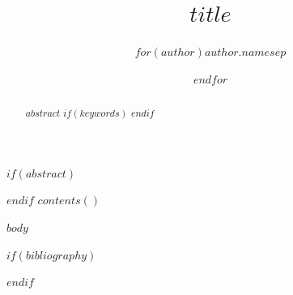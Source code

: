 \documentclass[$for(classoption)$$classoption$$sep$,$endfor$]{llncs}
\begin{document}
\title{$title$}
\author{$for(author)$$author.name$$sep$ \and $endfor$}
\maketitle
$if(abstract)$
\begin{abstract}
$abstract$
$if(keywords)$
$endif$
\end{abstract}
$endif$
$contents()$

$body$

$if(bibliography)$


$endif$
\end{document}
